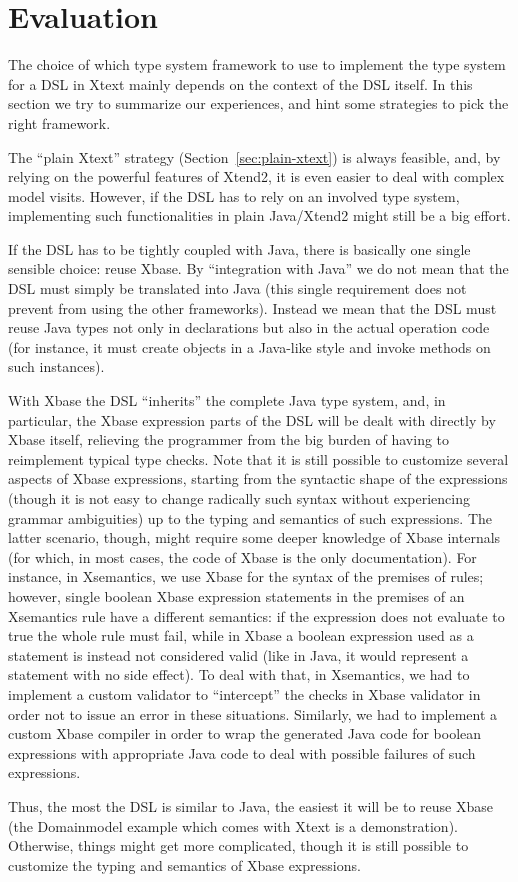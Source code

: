 \section{Evaluation}
\label{sec:evaluation}

The choice of which type system framework to use to implement the type system
for a DSL in Xtext mainly depends on the context of the DSL itself.  In this
section we try to summarize our experiences, and hint some strategies to pick
the right framework.

The ``plain Xtext'' strategy (Section~\ref{sec:plain-xtext}) is always feasible,
and, by relying on the powerful features of Xtend2, it is even easier to deal
with complex model visits.
However, if the DSL has to rely on an involved type system, implementing such
functionalities in plain Java/Xtend2 might still be a big effort.

If the DSL has to be tightly coupled with Java, there is basically one single
sensible choice: reuse Xbase.  By ``integration with Java'' we do not mean that
the DSL must simply be translated into Java (this single requirement does not
prevent from using the other frameworks).  Instead we mean that the DSL must
reuse Java types not only in declarations but also in the actual operation code
(for instance, it must create objects in a Java-like style and invoke methods on
such instances).

With Xbase the DSL ``inherits'' the complete Java type system, and, in
particular, the Xbase expression parts of the DSL will be dealt with directly by
Xbase itself, relieving the programmer from the big burden of having to
reimplement typical type checks.  Note that it is still possible to customize
several aspects of Xbase expressions, starting from the syntactic shape of the
expressions (though it is not easy to change radically such syntax without
experiencing grammar ambiguities) up to the typing and semantics of such
expressions.  The latter scenario, though, might require some deeper knowledge
of Xbase internals (for which, in most cases, the code of Xbase is the only
documentation).  For instance, in Xsemantics, we use Xbase for the syntax of the
premises of rules; however, single boolean Xbase expression statements in the
premises of an Xsemantics rule have a different semantics: if the expression
does not evaluate to true the whole rule must fail, while in Xbase a boolean
expression used as a statement is instead not considered valid (like in Java, it
would represent a statement with no side effect).  To deal with that, in
Xsemantics, we had to implement a custom validator to ``intercept'' the checks
in Xbase validator in order not to issue an error in these situations.
Similarly, we had to implement a custom Xbase compiler in order to wrap the
generated Java code for boolean expressions with appropriate Java code to deal
with possible failures of such expressions.

Thus, the most the DSL is similar to Java, the easiest it will be to reuse Xbase
(the Domainmodel example which comes with Xtext is a demonstration).  Otherwise,
things might get more complicated, though it is still possible to customize the
typing and semantics of Xbase expressions.

